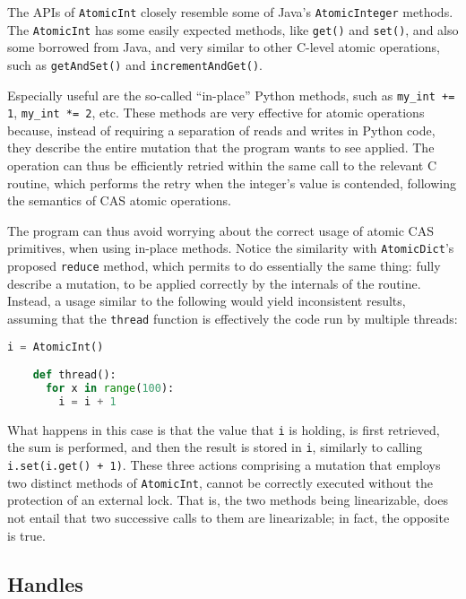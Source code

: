 The APIs of \texttt{AtomicInt} closely resemble some of Java's \texttt{AtomicInteger} methods.
The \texttt{AtomicInt} has some easily expected methods, like \texttt{{get()}} and \texttt{{set()}}, and also some borrowed from Java, and very similar to other C-level atomic operations, such as \texttt{getAndSet()} and \texttt{{incrementAndGet()}}.

Especially useful are the so-called ``in-place'' Python methods, such as \texttt{my\-\_int += 1}, \texttt{my\_int *= 2}, etc.
These methods are very effective for atomic operations because, instead of requiring a separation of reads and writes in Python code, they describe the entire mutation that the program wants to see applied.
The operation can thus be efficiently retried within the same call to the relevant C routine, which performs the retry when the integer's value is contended, following the semantics of CAS atomic operations\@.

The program can thus avoid worrying about the correct usage of atomic CAS primitives, when using in-place methods.
Notice the similarity with \texttt{Atomic\-Dict}'s proposed \texttt{reduce} method, which permits to do essentially the same thing: fully describe a mutation, to be applied correctly by the internals of the routine.
Instead, a usage similar to the following would yield inconsistent results, assuming that the \texttt{thread} function is effectively the code run by multiple threads:
\begin{lstlisting}[label={lst:atomic-int-bad}, language=Python]
    i = AtomicInt()

    def thread():
      for x in range(100):
        i = i + 1
\end{lstlisting}

What happens in this case is that the value that \texttt{i} is holding, is first retrieved, the sum is performed, and then the result is stored in \texttt{i}, similarly to calling \texttt{{i.set(i.get() + 1)}}.
These three actions comprising a mutation that employs two distinct methods of \texttt{AtomicInt}, cannot be correctly executed without the protection of an external lock.
That is, the two methods being linearizable, does not entail that two successive calls to them are linearizable; in fact, the opposite is true.


\subsection{Handles}\label{subsec:atomic-int-handles}


